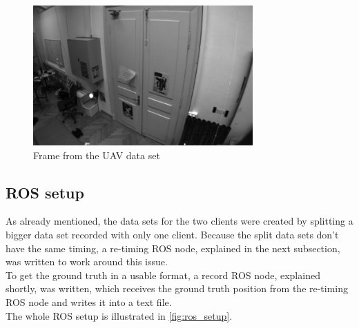 \begin{figure}[H]
  \centering
  \includegraphics[width=0.75\textwidth]{images/frame0128}
  \caption{Frame from the \ac{UAV} data set}
  \label{fig:dataset_uav}
\end{figure}

\subsection{\acf{ROS} setup}
As already mentioned, the data sets for the two clients were created by splitting a bigger data set recorded with only one client. Because the split data sets don't have the same timing, a re-timing \ac{ROS} node, explained in the next subsection, was written to work around this issue.\\
To get the ground truth in a usable format, a record \ac{ROS} node, explained shortly, was written, which receives the ground truth position from the re-timing \ac{ROS} node and writes it into a text file.\\

The whole \ac{ROS} setup is illustrated in \autoref{fig:ros_setup}.

